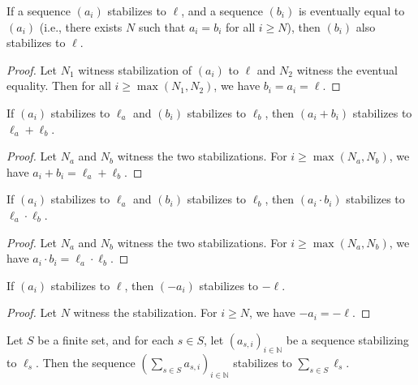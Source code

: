 \begin{lemma}
\label{lem.fps.lim.stab-eventually-eq}
\leanhelper
\leanok
If a sequence $(a_i)$ stabilizes to $\ell$, and a sequence $(b_i)$ is
eventually equal to $(a_i)$ (i.e., there exists $N$ such that $a_i = b_i$
for all $i \geq N$), then $(b_i)$ also stabilizes to $\ell$.
\end{lemma}

\begin{proof}
\leanok
Let $N_1$ witness stabilization of $(a_i)$ to $\ell$ and $N_2$ witness the
eventual equality. Then for all $i \geq \max(N_1, N_2)$, we have
$b_i = a_i = \ell$.
\end{proof}

\begin{lemma}
\label{lem.fps.lim.stab-add}
\leanhelper
\leanok
If $(a_i)$ stabilizes to $\ell_a$ and $(b_i)$ stabilizes to $\ell_b$, then
$(a_i + b_i)$ stabilizes to $\ell_a + \ell_b$.
\end{lemma}

\begin{proof}
\leanok
Let $N_a$ and $N_b$ witness the two stabilizations. For $i \geq \max(N_a, N_b)$,
we have $a_i + b_i = \ell_a + \ell_b$.
\end{proof}

\begin{lemma}
\label{lem.fps.lim.stab-mul}
\leanhelper
\leanok
If $(a_i)$ stabilizes to $\ell_a$ and $(b_i)$ stabilizes to $\ell_b$, then
$(a_i \cdot b_i)$ stabilizes to $\ell_a \cdot \ell_b$.
\end{lemma}

\begin{proof}
\leanok
Let $N_a$ and $N_b$ witness the two stabilizations. For $i \geq \max(N_a, N_b)$,
we have $a_i \cdot b_i = \ell_a \cdot \ell_b$.
\end{proof}

\begin{lemma}
\label{lem.fps.lim.stab-neg}
\leanhelper
\leanok
If $(a_i)$ stabilizes to $\ell$, then $(-a_i)$ stabilizes to $-\ell$.
\end{lemma}

\begin{proof}
\leanok
Let $N$ witness the stabilization. For $i \geq N$,
we have $-a_i = -\ell$.
\end{proof}

\begin{lemma}
\label{lem.fps.lim.stab-finset-sum}
\leanhelper
\leanok
Let $S$ be a finite set, and for each $s \in S$, let $(a_{s,i})_{i \in \mathbb{N}}$
be a sequence stabilizing to $\ell_s$. Then the sequence
$\left(\sum_{s \in S} a_{s,i}\right)_{i \in \mathbb{N}}$ stabilizes to
$\sum_{s \in S} \ell_s$.
\end{lemma}

